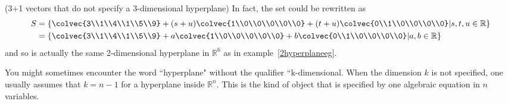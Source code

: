 \begin{example}{(3+1 vectors that do not specify a  3-dimensional hyperplane)}
In fact, the set could be rewritten as 
\begin{align*}
S&=\left\{ \colvec{3\\1\\4\\1\\5\\9} + (s+u)\colvec{1\\0\\0\\0\\0\\0} + (t+u)\colvec{0\\1\\0\\0\\0\\0} \middle\vert s, t,u \in \mathbb{R} \right\}\\
&=
\left\{ \colvec{3\\1\\4\\1\\5\\9} + a\colvec{1\\0\\0\\0\\0\\0} + b\colvec{0\\1\\0\\0\\0\\0} \middle\vert a,b \in \mathbb{R} \right\}
\end{align*}
and so is actually the same 2-dimensional hyperplane in $\mathbb{R}^6$  as in example~\ref{2hyperplaneeg}.
\end{example}
















You might sometimes encounter the word ``hyperplane" without the qualifier ``k-dimensional. 
When the dimension $k$ is not specified, one usually assumes that $k=n-1$ for a hyperplane inside ${\mathbb R}^n$. This is the kind of object that is specified by one algebraic equation in $n$ variables. 

